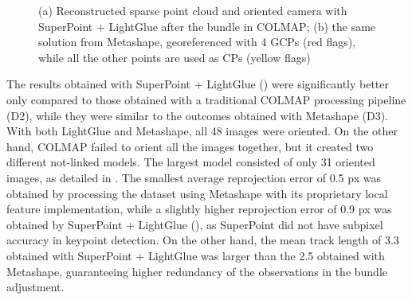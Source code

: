 \begin{figure}
  \centering
  \caption{(a) Reconstructed sparse point cloud and oriented camera with SuperPoint + LightGlue after the bundle in COLMAP; (b) the same solution from Metashape, georeferenced with 4 GCPs (red flags), while all the other points are used as CPs (yellow flags)}
  \label{fig:5:castle_rec}
\end{figure}

The results obtained with SuperPoint + LightGlue () were significantly better only compared to those obtained with a traditional COLMAP processing pipeline (D2), while they were similar to the outcomes obtained with Metashape (D3). 
With both LightGlue and Metashape, all 48 images were oriented. On the other hand, COLMAP failed to orient all the images together, but it created two different not-linked models. The largest model consisted of only 31 oriented images, as detailed in . 
The smallest average reprojection error of 0.5 px was obtained by processing the dataset using Metashape with its proprietary local feature implementation, while a slightly higher reprojection error of 0.9 px was obtained by SuperPoint + LightGlue (), as SuperPoint did not have subpixel accuracy in keypoint detection. 
On the other hand, the mean track length of 3.3 obtained with SuperPoint + LightGlue was larger than the 2.5 obtained with Metashape, guaranteeing higher redundancy of the observations in the bundle adjustment. 

